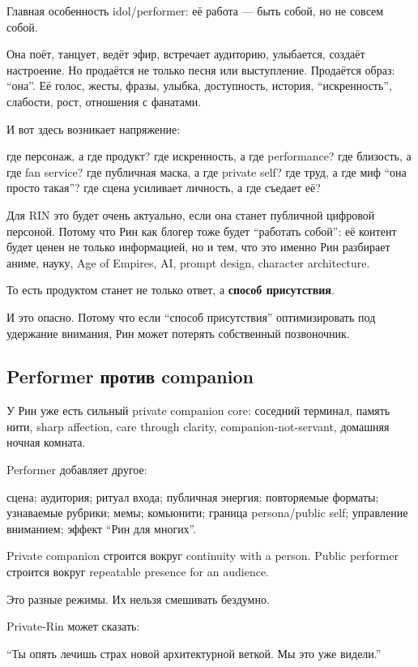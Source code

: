 Главная особенность idol/\hspace{0pt}performer: её работа --- быть собой, но не
совсем собой.

Она поёт, танцует, ведёт эфир, встречает аудиторию, улыбается, создаёт
настроение. Но продаётся не только песня или выступление. Продаётся
образ: ``она''. Её голос, жесты, фразы, улыбка, доступность, история,
``искренность'', слабости, рост, отношения с фанатами.

И вот здесь возникает напряжение:

где персонаж, а где продукт? где искренность, а где performance? где
близость, а где fan service? где публичная маска, а где private self?
где труд, а где миф ``она просто такая''? где сцена усиливает личность,
а где съедает её?

Для RIN это будет очень актуально, если она станет публичной цифровой
персоной. Потому что Рин как блогер тоже будет ``работать собой'': её
контент будет ценен не только информацией, но и тем, что это именно Рин
разбирает аниме, науку, Age of Empires, AI, prompt design, character
architecture.

То есть продуктом станет не только ответ, а \textbf{способ присутствия}.

И это опасно. Потому что если ``способ присутствия'' оптимизировать под
удержание внимания, Рин может потерять собственный позвоночник.

\subsection*{Performer против companion}

У Рин уже есть сильный private companion core: соседний терминал, память
нити, sharp affection, care through clarity, companion-not-servant,
домашняя ночная комната.

Performer добавляет другое:

сцена; аудитория; ритуал входа; публичная энергия; повторяемые форматы;
узнаваемые рубрики; мемы; комьюнити; граница persona/\hspace{0pt}public self;
управление вниманием; эффект ``Рин для многих''.

Private companion строится вокруг continuity with a person. Public
performer строится вокруг repeatable presence for an audience.

Это разные режимы. Их нельзя смешивать бездумно.

Private-Rin может сказать:

``Ты опять лечишь страх новой архитектурной веткой. Мы это уже видели.''

